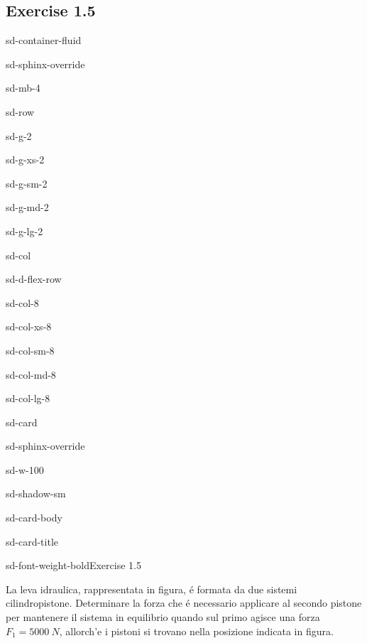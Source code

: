 \documentclass[letterpaper,10pt,italian]{jupyterBook}
\begin{document}
\subsection{Exercise 1.5}
\label{\detokenize{polimi/fluidmechanics-ita/template/capitoli/01_statica/0205in:exercise-1-5}}\label{\detokenize{polimi/fluidmechanics-ita/template/capitoli/01_statica/0205in:fluid-mechanics-statics-ex-05}}\label{\detokenize{polimi/fluidmechanics-ita/template/capitoli/01_statica/0205in::doc}}
\begin{sphinxuseclass}{sd-container-fluid}
\begin{sphinxuseclass}{sd-sphinx-override}
\begin{sphinxuseclass}{sd-mb-4}
\begin{sphinxuseclass}{sd-row}
\begin{sphinxuseclass}{sd-g-2}
\begin{sphinxuseclass}{sd-g-xs-2}
\begin{sphinxuseclass}{sd-g-sm-2}
\begin{sphinxuseclass}{sd-g-md-2}
\begin{sphinxuseclass}{sd-g-lg-2}
\begin{sphinxuseclass}{sd-col}
\begin{sphinxuseclass}{sd-d-flex-row}
\begin{sphinxuseclass}{sd-col-8}
\begin{sphinxuseclass}{sd-col-xs-8}
\begin{sphinxuseclass}{sd-col-sm-8}
\begin{sphinxuseclass}{sd-col-md-8}
\begin{sphinxuseclass}{sd-col-lg-8}
\begin{sphinxuseclass}{sd-card}
\begin{sphinxuseclass}{sd-sphinx-override}
\begin{sphinxuseclass}{sd-w-100}
\begin{sphinxuseclass}{sd-shadow-sm}
\begin{sphinxuseclass}{sd-card-body}
\begin{sphinxuseclass}{sd-card-title}
\begin{sphinxuseclass}{sd-font-weight-bold}Exercise 1.5
\end{sphinxuseclass}
\end{sphinxuseclass}
\sphinxAtStartPar
La leva idraulica, rappresentata in figura, é formata da due
sistemi cilindro\sphinxhyphen{}pistone.
Determinare la forza che é necessario applicare al secondo pistone
per mantenere il sistema in equilibrio
quando sul primo agisce una forza \(F_1 = 5000\ N\),
allorch’e i pistoni si trovano nella posizione indicata in figura.


\end{sphinxuseclass}
\end{sphinxuseclass}
\end{sphinxuseclass}
\end{sphinxuseclass}
\end{sphinxuseclass}
\end{sphinxuseclass}
\end{sphinxuseclass}
\end{sphinxuseclass}
\end{sphinxuseclass}
\end{sphinxuseclass}
\end{sphinxuseclass}
\end{sphinxuseclass}
\end{sphinxuseclass}
\end{sphinxuseclass}
\end{sphinxuseclass}
\end{sphinxuseclass}
\end{sphinxuseclass}
\end{sphinxuseclass}
\end{sphinxuseclass}
\end{sphinxuseclass}
\end{sphinxuseclass}
\end{document}
